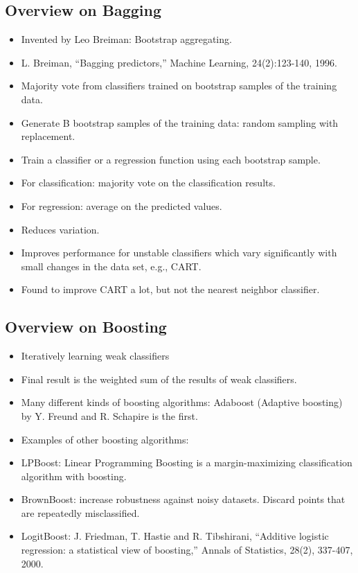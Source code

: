 \subsection{Overview on Bagging}
\begin{itemize}
\item Invented by Leo Breiman: Bootstrap aggregating.
\item L. Breiman, “Bagging predictors,” Machine Learning,
24(2):123-140, 1996.
\item Majority vote from classiﬁers trained on bootstrap samples of
the training data.
\item Generate B bootstrap samples of the training data: random
sampling with replacement.
\item Train a classiﬁer or a regression function using each bootstrap
sample.
\item For classiﬁcation: majority vote on the classiﬁcation results.
\item For regression: average on the predicted values.
\item Reduces variation.
\item Improves performance for unstable classiﬁers which vary signiﬁcantly with small changes in the data set, e.g., CART.
\item Found to improve CART a lot, but not the nearest neighbor classifier.
\end{itemize}
\subsection{Overview on Boosting}
\begin{itemize}
\item Iteratively learning weak classiﬁers
\item  Final result is the weighted sum of the results of weak
classiﬁers.
\item  Many diﬀerent kinds of boosting algorithms: Adaboost
(Adaptive boosting) by Y. Freund and R. Schapire is the first.
\item  Examples of other boosting algorithms:
\item  LPBoost: Linear Programming Boosting is a
margin-maximizing classiﬁcation algorithm with boosting.
\item  BrownBoost: increase robustness against noisy datasets.
Discard points that are repeatedly misclassiﬁed.
\item  LogitBoost: J. Friedman, T. Hastie and R. Tibshirani,
“Additive logistic regression: a statistical view of boosting,”
Annals of Statistics, 28(2), 337-407, 2000.
\end{itemize}

